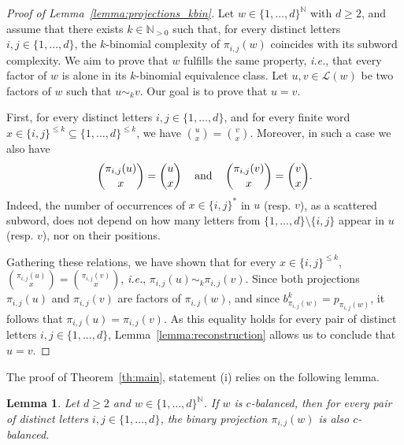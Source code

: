 \documentclass{template_arxiv}
\newtheorem{lemma}{Lemma}%
\theoremstyle{definition}
\newcommand{\N}{\mathbb{N}}
\newcommand{\lan}{\mathcal{L}}
\begin{document}
\begin{proof}[Proof of Lemma~\ref{lemma:projections_kbin}]
Let $w\in\{1,\ldots,d\}^\N$ with $d\geq 2$, and assume that there exists $k\in\N_{>0}$ such that, for every distinct letters $i,j\in\{1,\ldots,d\}$, the $k$-binomial complexity of $\pi_{i,j}(w)$ coincides with its subword complexity. We aim to prove that $w$ fulfills the same property, \emph{i.e.}, that every factor of $w$ is alone in its $k$-binomial equivalence class. Let $u,v\in\lan(w)$ be two factors of $w$ such that $u\sim_{k}v$. Our goal is to prove that $u=v$.

First, for every distinct letters $i,j\in\{1,\ldots,d\}$, and for every finite word $x\in\{i,j\}^{\leq k}\subseteq\{1,\ldots,d\}^{\leq k}$, we have $\binom{u}{x}=\binom{v}{x}$. Moreover, in such a case we also have
\begin{equation}\label{eq:projections}
    \binom{\pi_{i,j}(u)}{x}=\binom{u}{x} \hspace{0.3cm}\text{ and }\hspace{0.3cm} \binom{\pi_{i,j}(v)}{x}=\binom{v}{x}.
\end{equation}
Indeed, the number of occurrences of $x\in\{i,j\}^*$ in $u$ (resp. $v$), as a scattered subword, does not depend on how many letters from $\{1,\ldots,d\}\setminus\{i,j\}$ appear in $u$ (resp. $v$), nor on their positions.

Gathering these relations, we have shown that for every $x\in\{i,j\}^{\leq k}$, $\binom{\pi_{i,j}(u)}{x}=\binom{\pi_{i,j}(v)}{x}$, \emph{i.e.}, $\pi_{i,j}(u)\sim_k\pi_{i,j}(v)$. Since both projections $\pi_{i,j}(u)$ and $\pi_{i,j}(v)$ are factors of $\pi_{i,j}(w)$, and since $b_{\pi_{i,j}(w)}^k=p_{\pi_{i,j}(w)}$, it follows that $\pi_{i,j}(u)=\pi_{i,j}(v)$. As this equality holds for every pair of distinct letters $i,j\in\{1,\ldots,d\}$, Lemma~\ref{lemma:reconstruction} allows us to conclude that $u=v$.
\end{proof}

The proof of Theorem~\ref{th:main}, statement (i) relies on the following lemma.

\begin{lemma}\label{lemma:c_balanced}
Let $d\geq 2$ and $w\in\{1,\ldots,d\}^\N$. If $w$ is $c$-balanced, then for every pair of distinct letters $i,j\in\{1,\ldots,d\}$, the binary projection $\pi_{i,j}(w)$ is also $c$-balanced.
\end{lemma}
\end{document}
